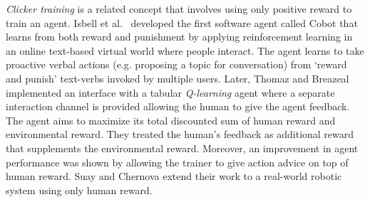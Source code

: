 \documentclass[10pt,journal,compsoc]{IEEEtran}
\begin{document}
\emph{Clicker training} \cite{blumberg2002integrated} is a related concept that involves using only positive reward to train an agent. %
Isbell et al.\ \cite{isbell2001social} developed the first software agent called Cobot that learns from both reward and punishment
by applying reinforcement learning in an online text-based virtual world where people interact. The agent learns to take proactive verbal actions (e.g. proposing a topic for conversation) from `reward and punish' text-verbs invoked by multiple users. %
Later, Thomaz and Breazeal \cite{thomaz2008teachable} implemented an interface with a tabular \emph{Q-learning} \cite{watkins1992q} agent where a separate interaction channel is provided allowing the human to give the agent feedback. The agent aims %
to maximize its total discounted sum of human reward and environmental reward. They treated the human's feedback as additional reward that supplements the environmental reward. Moreover, an improvement in agent performance was shown by allowing the trainer to give action advice on top of human reward. 
Suay and Chernova \cite{suay2011effect} extend their work to a real-world robotic system using only human reward.%
\end{document}
